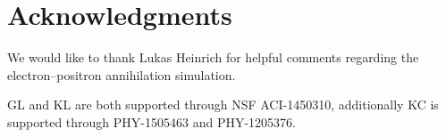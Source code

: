 \documentclass[twocolumn,superscriptaddress,aps]{revtex4-1}
\theoremstyle{plain}
\begin{document}

\section*{Acknowledgments}

We would like to thank Lukas Heinrich for helpful comments regarding
the electron--positron annihilation simulation.

GL and KL are both supported through NSF ACI-1450310, additionally KC is
supported through PHY-1505463 and PHY-1205376.





\end{document}
